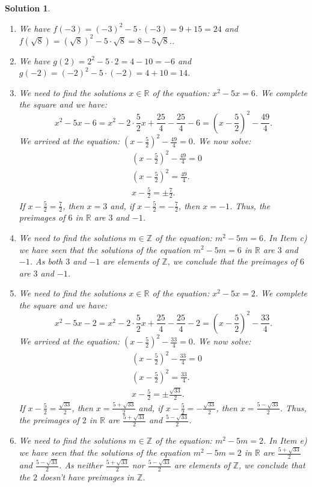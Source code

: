 \documentclass[12pt]{article}
\newtheorem{sol}[prop]{Solution}
\begin{document}
\begin{sol}
\begin{enumerate}
\item[a)] We have $f(-3)=(-3)^{2}-5\cdot (-3)=9+15=24$ and $f(\sqrt{8})=(\sqrt{8})^{2}-5\cdot \sqrt{8}=8-5\sqrt{8}$..
\item[b)] We have $g(2)=2^{2}-5\cdot 2=4-10=-6$ and $g(-2)=(-2)^{2}-5\cdot (-2)=4+10=14$.
\item[c)] We need to find the solutions $x\in \mathbb{R}$ of the equation: $x^{2}-5x=6$. We complete the square and we have:
 $$x^{2}-5x-6=x^{2}-2\cdot \frac{5}{2}x+\frac{25}{4}-\frac{25}{4}-6=(x-\frac{5}{2})^{2}-\frac{49}{4}.$$
We arrived at the equation: $(x-\frac{5}{2})^{2}-\frac{49}{4}=0$. We now solve:
\begin{equation*}
\begin{split}
& (x-\frac{5}{2})^{2}-\frac{49}{4}=0\\
& (x-\frac{5}{2})^{2}=\frac{49}{4}.\\
& x-\frac{5}{2}=\pm \frac{7}{2}.
\end{split}
\end{equation*}
If $x-\frac{5}{2}= \frac{7}{2}$, then $x=3$ and, if $x- \frac{5}{2}=- \frac{7}{2}$, then $x=-1$. Thus, the preimages of $6$ in $\mathbb{R}$ are $3$ and $-1$.
\item[d)] We need to find the solutions $m\in \mathbb{Z}$ of the equation: $m^{2}-5m=6$. In Item c) we have seen that the solutions of the equation $m^{2}-5m=6$ in $\mathbb{R}$ are $3$ and $-1$. As both $3$ and $-1$ are elements of $\mathbb{Z}$, we conclude that the preimages of $6$ are $3$ and $-1$.
\item[e)] We need to find the solutions $x\in \mathbb{R}$ of the equation: $x^{2}-5x=2$. We complete the square and we have:
 $$x^{2}-5x-2=x^{2}-2\cdot \frac{5}{2}x+\frac{25}{4}-\frac{25}{4}-2=(x-\frac{5}{2})^{2}-\frac{33}{4}.$$
We arrived at the equation: $(x-\frac{5}{2})^{2}-\frac{33}{4}=0$. We now solve:
\begin{equation*}
\begin{split}
& (x-\frac{5}{2})^{2}-\frac{33}{4}=0\\
& (x-\frac{5}{2})^{2}=\frac{33}{4}.\\
& x-\frac{5}{2}=\pm \frac{\sqrt{33}}{2}.
\end{split}
\end{equation*}
If $x-\frac{5}{2}= \frac{\sqrt{33}}{2}$, then $x=\frac{5+\sqrt{33}}{2}$ and, if $x- \frac{5}{2}=- \frac{\sqrt{33}}{2}$, then $x=\frac{5-\sqrt{33}}{2}$. Thus, the preimages of $2$ in $\mathbb{R}$ are $\frac{5+\sqrt{33}}{2}$ and $\frac{5-\sqrt{33}}{2}$.
\item[f)] We need to find the solutions $m\in \mathbb{Z}$ of the equation: $m^{2}-5m=2$. In Item e) we have seen that the solutions of the equation $m^{2}-5m=2$ in $\mathbb{R}$ are $\frac{5+\sqrt{33}}{2}$ and $\frac{5-\sqrt{33}}{2}$. As neither $\frac{5+\sqrt{33}}{2}$ nor $\frac{5-\sqrt{33}}{2}$ are elements of $\mathbb{Z}$, we conclude that the $2$ doesn't have preimages in $\mathbb{Z}$.
\end{enumerate}
\end{sol}
\end{document}
